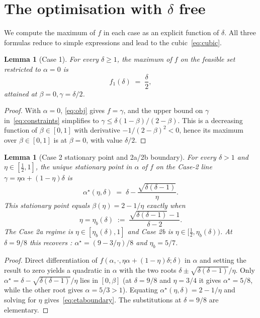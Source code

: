 \documentclass[11pt,a4paper]{article}
\newtheorem{lemma}[theorem]{Lemma}
\theoremstyle{definition}
\begin{document}
\section{The optimisation with \texorpdfstring{$\delta$}{delta} free}
\label{sec:optimisation}

We compute the maximum of $f$ in each case as an explicit function of
$\delta$. All three formulas reduce to simple expressions and lead to
the cubic~\eqref{eq:cubic}.

\begin{lemma}[Case 1]\label{lem:case1}
For every $\delta\ge 1$, the maximum of $f$ on the feasible set
restricted to $\alpha=0$ is
\[
  f_1(\delta) \;=\; \frac{\delta}{2},
\]
attained at $\beta=0,\gamma=\delta/2$.
\end{lemma}

\begin{proof}
With $\alpha=0$, \eqref{eq:obj} gives $f=\gamma$, and the upper bound
on $\gamma$ in~\eqref{eq:constraints} simplifies to
$\gamma\le\delta(1-\beta)/(2-\beta)$. This is a decreasing function of
$\beta\in[0,1]$ with derivative $-1/(2-\beta)^2<0$, hence its maximum
over $\beta\in[0,1]$ is at $\beta=0$, with value $\delta/2$.
\end{proof}

\begin{lemma}[Case 2 stationary point and 2a/2b boundary]\label{lem:stationary}
For every $\delta>1$ and $\eta\in[\tfrac12,1]$, the unique stationary
point in $\alpha$ of $f$ on the Case-2 line
$\gamma=\eta\alpha+(1-\eta)\delta$ is
\begin{equation}\label{eq:alphastar}
   \alpha^{\star}(\eta,\delta)
   \;=\;
   \delta - \frac{\sqrt{\delta(\delta-1)}}{\eta}.
\end{equation}
This stationary point equals $\beta(\eta)=2-1/\eta$ exactly when
\begin{equation}\label{eq:etaboundary}
   \eta=\eta_{b}(\delta)
   \;:=\;\frac{\sqrt{\delta(\delta-1)}-1}{\delta-2}.
\end{equation}
The Case 2a regime is $\eta\in[\eta_b(\delta),1]$ and Case 2b is
$\eta\in[\tfrac12,\eta_b(\delta))$. At $\delta=9/8$ this recovers
\cite[(p.~10)]{FPS}: $\alpha^{\star}=(9-3/\eta)/8$ and
$\eta_b=5/7$.
\end{lemma}

\begin{proof}
Direct differentiation of
$f(\alpha,\cdot,\eta\alpha+(1-\eta)\delta;\delta)$ in $\alpha$ and
setting the result to zero yields a quadratic in $\alpha$ with the two
roots $\delta\pm\sqrt{\delta(\delta-1)}/\eta$. Only
$\alpha^{\star}=\delta-\sqrt{\delta(\delta-1)}/\eta$ lies in $[0,\beta]$
(at $\delta=9/8$ and $\eta=3/4$ it gives $\alpha^{\star}=5/8$, while the
other root gives $\alpha=5/3>1$). Equating
$\alpha^{\star}(\eta,\delta)=2-1/\eta$ and solving for $\eta$
gives~\eqref{eq:etaboundary}. The substitutions at $\delta=9/8$ are
elementary.
\end{proof}
\end{document}
